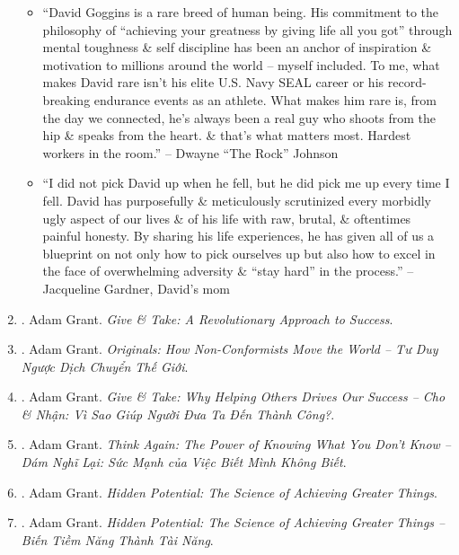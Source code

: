 \documentclass{article}
\begin{document}
\begin{enumerate}
\begin{itemize}
		\item ``{\sc David Goggins} is a rare breed of human being. His commitment to the philosophy of ``achieving your greatness by giving life all you got'' through mental toughness \& self discipline has been an anchor of inspiration \& motivation to millions around the world -- myself included. To me, what makes {\sc David} rare isn't his elite U.S. Navy SEAL career or his record-breaking endurance events as an athlete. What makes him rare is, from the day we connected, he's always been a real guy who shoots from the hip \& speaks from the heart. \& that's what matters most. Hardest workers in the room.'' -- {\sc Dwayne ``The Rock'' Johnson}
		\item ``I did not pick {\sc David} up when he fell, but he did pick me up every time I fell. {\sc David} has purposefully \& meticulously scrutinized every morbidly ugly aspect of our lives \& of his life with raw, brutal, \& oftentimes painful honesty. By sharing his life experiences, he has given all of us a blueprint on not only how to pick ourselves up but also how to excel in the face of overwhelming adversity \& ``stay hard'' in the process.'' -- {\sc Jacqueline Gardner, David}'s mom
	\end{itemize}
	
	\item \cite{Grant_give_take}. {\sc Adam Grant}. {\it Give \& Take: A Revolutionary Approach to Success}.\hfill{\sf[reading]}
	
	\item \cite{Grant_original_VN}. {\sc Adam Grant}. {\it Originals: How Non-Conformists Move the World -- Tư Duy Ngược Dịch Chuyển Thế Giới}.\hfill{\sf[done]}
	
	\item \cite{Grant_give_take_VN}. {\sc Adam Grant}. {\it Give \& Take: Why Helping Others Drives Our Success -- Cho \& Nhận: Vì Sao Giúp Người Đưa Ta Đến Thành Công?}.\hfill{\sf[done]}
	
	\item \cite{Grant_think_again_VN}. {\sc Adam Grant}. {\it Think Again: The Power of Knowing What You Don't Know -- Dám Nghĩ Lại: Sức Mạnh của Việc Biết Mình Không Biết}.\hfill{\sf[done]}
	
	\item \cite{Grant_hidden_potential}. {\sc Adam Grant}. {\it Hidden Potential: The Science of Achieving Greater Things}.
	
	\item \cite{Grant_hidden_potential_VN}. {\sc Adam Grant}. {\it Hidden Potential: The Science of Achieving Greater Things  -- Biến Tiềm Năng Thành Tài Năng}.\hfill{\sf[done]}
	

\end{enumerate}
\end{document}

